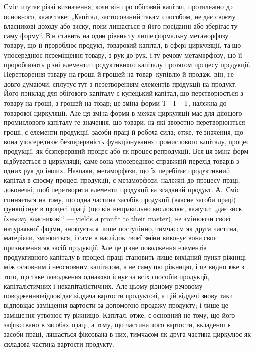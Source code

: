 Сміс плутає різні визначення, коли він про обіговий капітал, протилежно
до основного, каже таке: „Капітал, застосований таким способом,
не дає своєму власникові доходу або зиску, поки лишається в його посіданні
або зберігає ту саму форму“. Він ставить на один рівень ту лише
формальну метаморфозу товару, що її пророблює продукт, товаровий
капітал, в сфері циркуляції, та що упосереднює переміщення товару,
з рук до рук, і ту речову метаморфозу, що її пророблюють різні елементи
продуктивного капіталу протягом процесу продукції. Перетворення
товару на гроші й грошей на товар, купівлю й продаж, він, не довго
думаючи, сплутує тут з перетворенням елементів продукції на продукт.
Його приклад для обігового капіталу є купецький капітал, що перетворюється
з товару на гроші, з грошей на товар; це зміна форми $Т — Г — Т$,
належна до товарової циркуляції. Але ця зміна форми в межах циркуляції
має для діющого промислового капіталу те значення, що товари, на
які зворотно перетворюються гроші, є елементи продукції, засоби праці
й робоча сила; отже, те значення, що вона упосереднює безперервність
функціонування промислового капіталу, процес продукції, як безперервний
процес або як процес репродукції. Вся ця зміна форм відбувається
в циркуляції; саме вона упосереднює справжній перехід товарів з
одних рук до інших. Навпаки, метаморфози, що їх перебігає продуктивний
капітал в своєму процесі продукції, є метаморфози, належні до
процесу праці, доконечні, щоб перетворити елементи продукції на
згаданий продукт. А.~Сміс спиняється на тому, що одна частина засобів
продукції (власне засоби праці) функціонує в процесі праці (що він
неправильно висловлює, кажучи: „дає зиск їхньому власникові“ — yields а
pronfit to their master), не змінюючи своєї натуральної форми, зношується
лише поступінно, тимчасом як друга частина, матеріяли, змінюється, і
саме в наслідок своєї зміни виконує вона своє призначення як засіб продукції.
Але це різне поводження елементів продуктивного капіталу в
процесі праці становить лише вихідний пункт ріжниці між основним і неосновним
капіталом, а не саму цю ріжннцю, і це видно вже з того, що
таке поводження однаково існує за всіх способів продукції, капіталістичних
і некапіталістичних. Але цьому різному речовому поводженнювідповідає
віддача вартости продуктові, а цій віддачі знову таки відповідає
заміщення вартости за допомогою продажу продукту; і лише це
заміщення утворює ту ріжницю. Капітал, отже, є основний не тому, що
його зафіксовано в засобах праці, а тому, що частина його вартости,
вкладеної в засоби праці, лишається фіксована в них, тимчасом як друга
частина циркулює як складова частина вартости продукту.

